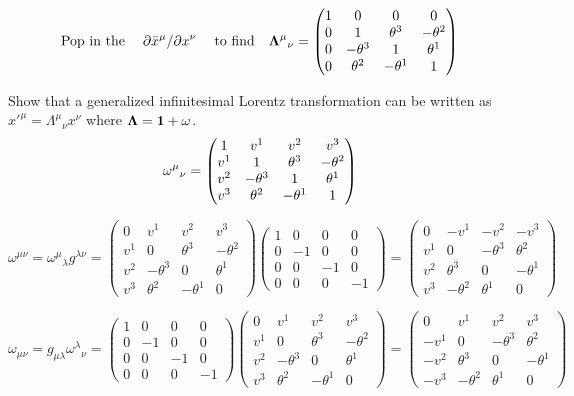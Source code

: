 \documentclass{article}
\begin{document}
\[ \qq*{Pop in the}\pdv*{\bar{x}^\mu}{x^\nu}\qq{to find}{\vb{\Lambda}^\mu}_\nu=\begin{pmatrix}1 & 0 & 0 & 0 \\0&1&\theta^3&-\theta^2\\0&-\theta^3&1&\theta^1\\0&\theta^2&-\theta^1&1\\
	\end{pmatrix}\]

Show that a generalized infinitesimal Lorentz transformation can be written as $x'^\mu={\Lambda^\mu}_\nu x^\nu$ where $\vb{\Lambda}=\vb{1}+\vb{\omega}$.
\[ {\vb{\omega}^\mu}_\nu=\begin{pmatrix}1 & v^1 & v^2 & v^3 \\v^1&1&\theta^3&-\theta^2\\v^2&-\theta^3&1&\theta^1\\v^3&\theta^2&-\theta^1&1\\
	\end{pmatrix}\]







\[\omega^{\mu\nu}={\omega^\mu}_\lambda g^{\lambda\nu}=\begin{pmatrix}0&v^1&v^2&v^3\\v^1&0&\theta^3&-\theta^2\\v^2&-\theta^3&0&\theta^1\\v^3&\theta^2&-\theta^1&0\end{pmatrix}
	\begin{pmatrix}1&0&0&0\\0&-1&0&0\\0&0&-1&0\\0&0&0&-1\end{pmatrix}=
	\begin{pmatrix}0&-v^1&-v^2&-v^3\\v^1&0&-\theta^3&\theta^2\\v^2&\theta^3&0&-\theta^1\\v^3&-\theta^2&\theta^1&0\end{pmatrix}\]

\[\omega_{\mu\nu}=g_{\mu\lambda}{\omega^\lambda}_\nu =\begin{pmatrix}1&0&0&0\\0&-1&0&0\\0&0&-1&0\\0&0&0&-1\end{pmatrix}
	\begin{pmatrix}0&v^1&v^2&v^3\\v^1&0&\theta^3&-\theta^2\\v^2&-\theta^3&0&\theta^1\\v^3&\theta^2&-\theta^1&0\end{pmatrix}=
	\begin{pmatrix}0&v^1&v^2&v^3\\-v^1&0&-\theta^3&\theta^2\\-v^2&\theta^3&0&-\theta^1\\-v^3&-\theta^2&\theta^1&0\end{pmatrix}\]
\end{document}
